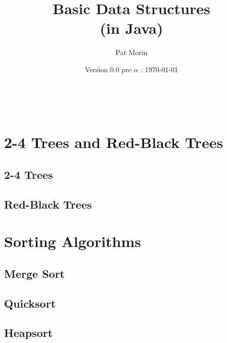 \documentclass[11pt]{book}
\title{Basic Data Structures\\(in Java)}
\author{Pat Morin}
\date{Version 0.0 pre $\alpha$ : \today}
\begin{document}
\begin{titlepage}
  \maketitle
\end{titlepage}

\ \newpage



\tableofcontents











\chapter{2-4 Trees and Red-Black Trees}
\section{2-4 Trees}
\section{Red-Black Trees}




\chapter{Sorting Algorithms}
\section{Merge Sort}
\section{Quicksort}
\section{Heapsort}
\end{document}
